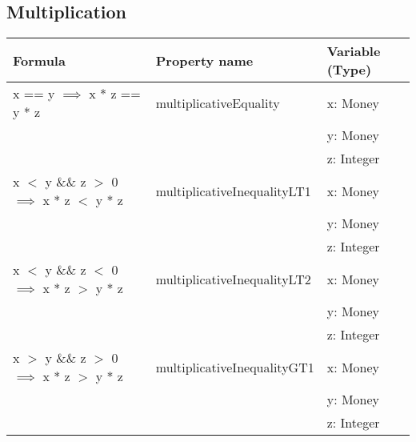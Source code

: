 \subsection*{Multiplication}
\label{ssct:properties_multiplication_updated}
\begin{table}[!ht]
\centering
\begin{tabular}{lll}
\hline
                        \textbf{Formula}                                & \textbf{Property name}      & \textbf{Variable (Type)} \\ \hline
\rowcolor[HTML]{EFEFEF} x == y $\implies$ x * z == y * z                & multiplicativeEquality      & x: Money                 \\
\rowcolor[HTML]{EFEFEF}                                                 &                             & y: Money                 \\
\rowcolor[HTML]{EFEFEF}                                                 &                             & z: Integer               \\
                        x $<$ y \&\& z $>$ 0 $\implies$ x * z $<$ y * z & multiplicativeInequalityLT1 & x: Money                 \\
                                                                        &                             & y: Money                 \\
                                                                        &                             & z: Integer               \\
\rowcolor[HTML]{EFEFEF} x $<$ y \&\& z $<$ 0 $\implies$ x * z $>$ y * z & multiplicativeInequalityLT2 & x: Money                 \\
\rowcolor[HTML]{EFEFEF}                                                 &                             & y: Money                 \\
\rowcolor[HTML]{EFEFEF}                                                 &                             & z: Integer               \\
                        x $>$ y \&\& z $>$ 0 $\implies$ x * z $>$ y * z & multiplicativeInequalityGT1 & x: Money                 \\
                                                                        &                             & y: Money                 \\
                                                                        &                             & z: Integer               \\

\end{tabular}
\end{table}
